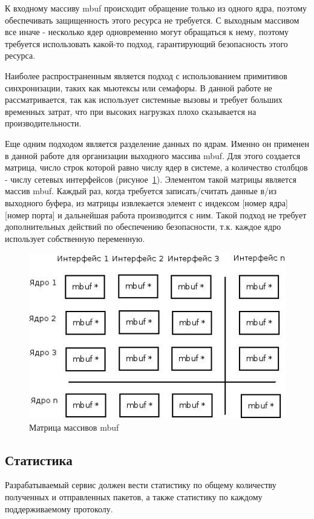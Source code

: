 К входному массиву mbuf происходит обращение только из одного ядра, поэтому обеспечивать защищенность этого ресурса не требуется. С выходным массивом все иначе - несколько ядер одновременно могут обращаться к нему, поэтому требуется использовать какой-то подход, гарантирующий безопасность этого ресурса.

Наиболее распространенным является подход с использованием примитивов синхронизации, таких как мьютексы или семафоры. В данной работе не рассматривается, так как использует системные вызовы и требует больших временных затрат, что при высоких нагрузках плохо сказывается на производительности.

Еще одним подходом является разделение данных по ядрам. Именно он применен в данной работе для организации выходного массива mbuf. Для этого создается матрица, число строк которой равно числу ядер в системе, а количество столбцов - числу сетевых интерфейсов (рисуное~\ref{pic:mbuf_matrix}). Элементом такой матрицы является массив mbuf. Каждый раз, когда требуется записать/считать данные в/из выходного буфера, из матрицы извлекается элемент с индексом [номер ядра][номер порта] и дальнейшая работа производится с ним. Такой подход не требует дополнительных действий по обеспечению безопасности, т.к. каждое ядро использует собственную переменную.
\begin{figure}
\centering
\includegraphics[scale=0.6]{pictures/mbuf_matrix}
\caption{Матрица массивов mbuf}
\label{pic:mbuf_matrix}
\end{figure}

\subsection{Статистика}
Разрабатываемый сервис должен вести статистику по общему количеству полученных и отправленных пакетов, а также статистику по каждому поддерживаемому протоколу.

